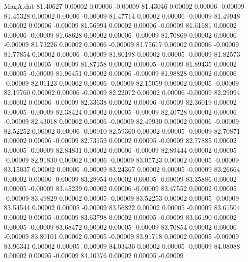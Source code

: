 \begin{filecontents}{MagA.dat}
  81.40627    0.00002    0.00006   -0.00009
  81.43046    0.00002    0.00006   -0.00009
  81.45328    0.00002    0.00006   -0.00009
  81.47714    0.00002    0.00006   -0.00009
  81.49948    0.00002    0.00006   -0.00009
  81.56994    0.00002    0.00006   -0.00009
  81.61681    0.00002    0.00006   -0.00009
  81.68628    0.00002    0.00006   -0.00009
  81.70869    0.00002    0.00006   -0.00009
  81.73226    0.00002    0.00006   -0.00009
  81.75617    0.00002    0.00006   -0.00009
  81.77854    0.00002    0.00006   -0.00009
  81.80198    0.00002    0.00005   -0.00009
  81.82573    0.00002    0.00005   -0.00009
  81.87158    0.00002    0.00005   -0.00009
  81.89435    0.00002    0.00005   -0.00009
  81.96451    0.00002    0.00006   -0.00009
  81.98828    0.00002    0.00006   -0.00009
  82.01123    0.00002    0.00006   -0.00009
  82.15059    0.00002    0.00005   -0.00009
  82.19760    0.00002    0.00006   -0.00009
  82.22072    0.00002    0.00006   -0.00009
  82.29094    0.00002    0.00006   -0.00009
  82.33638    0.00002    0.00006   -0.00009
  82.36019    0.00002    0.00005   -0.00009
  82.38424    0.00002    0.00005   -0.00009
  82.40728    0.00002    0.00006   -0.00009
  82.43018    0.00002    0.00006   -0.00009
  82.49930    0.00002    0.00006   -0.00009
  82.52252    0.00002    0.00006   -0.00010
  82.59360    0.00002    0.00005   -0.00009
  82.70871    0.00002    0.00006   -0.00009
  82.73159    0.00002    0.00005   -0.00009
  82.77885    0.00002    0.00005   -0.00009
  82.84831    0.00002    0.00006   -0.00009
  82.89444    0.00002    0.00005   -0.00009
  82.91830    0.00002    0.00006   -0.00009
  83.05723    0.00002    0.00005   -0.00009
  83.15037    0.00002    0.00006   -0.00009
  83.24367    0.00002    0.00005   -0.00009
  83.26664    0.00002    0.00006   -0.00009
  83.28954    0.00002    0.00005   -0.00009
  83.35886    0.00002    0.00005   -0.00009
  83.45239    0.00002    0.00006   -0.00009
  83.47552    0.00002    0.00005   -0.00009
  83.49829    0.00002    0.00005   -0.00009
  83.52253    0.00002    0.00005   -0.00009
  83.54544    0.00002    0.00005   -0.00009
  83.56822    0.00002    0.00005   -0.00009
  83.61504    0.00002    0.00005   -0.00009
  83.63798    0.00002    0.00005   -0.00009
  83.66190    0.00002    0.00005   -0.00009
  83.68472    0.00002    0.00005   -0.00009
  83.70854    0.00002    0.00006   -0.00009
  83.80101    0.00002    0.00005   -0.00009
  83.91718    0.00002    0.00005   -0.00009
  83.96341    0.00002    0.00005   -0.00009
  84.03436    0.00002    0.00005   -0.00009
  84.08088    0.00002    0.00005   -0.00009
  84.10376    0.00002    0.00005   -0.00009

\end{filecontents}
